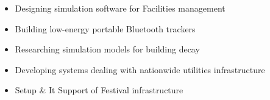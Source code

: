 \begin{itemize}
\item Designing simulation software for Facilities management
\end{itemize}

\divider


\begin{itemize}
	\item Building low-energy portable Bluetooth trackers
\end{itemize}

\divider



\begin{itemize}
	\item Researching simulation models for building decay 
\end{itemize}

\divider


\begin{itemize}
	\item Developing systems dealing with nationwide utilities infrastructure 
\end{itemize}

\divider

\begin{itemize}
	\item Setup \& It Support of Festival infrastructure
\end{itemize}

